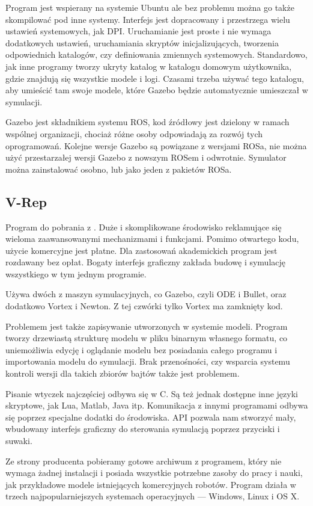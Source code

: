 	Program jest wspierany na systemie Ubuntu ale bez problemu można go także skompilować pod inne systemy.
	Interfejs jest dopracowany i przestrzega wielu ustawień systemowych, jak DPI.
	Uruchamianie jest proste i nie wymaga dodatkowych ustawień, uruchamiania skryptów inicjalizujących, tworzenia odpowiednich katalogów, czy definiowania zmiennych systemowych.
	Standardowo, jak inne programy tworzy ukryty katalog w katalogu domowym użytkownika, gdzie znajdują się wszystkie modele i logi.
	Czasami trzeba używać tego katalogu, aby umieścić tam swoje modele, które Gazebo będzie automatycznie umieszczał w symulacji.

	Gazebo jest składnikiem systemu ROS, kod źródłowy jest dzielony w ramach wspólnej organizacji, chociaż różne osoby odpowiadają za rozwój tych oprogramowań.
	Kolejne wersje Gazebo są powiązane z wersjami ROSa, nie można użyć przestarzałej wersji Gazebo z nowszym ROSem i odwrotnie.
	Symulator można zainstalować osobno, lub jako jeden z pakietów ROSa.

	\subsection{V-Rep}
	Program do pobrania z \cite{vrep_website}. Duże i skomplikowane środowisko reklamujące się wieloma zaawansowanymi mechanizmami i funkcjami.
	Pomimo otwartego kodu, użycie komercyjne jest płatne. Dla zastosowań akademickich program jest rozdawany bez opłat.
	Bogaty interfejs graficzny zakłada budowę i symulację wszystkiego w tym jednym programie.

	Używa dwóch z maszyn symulacyjnych, co Gazebo, czyli ODE i Bullet, oraz dodatkowo Vortex i Newton. Z tej czwórki tylko Vortex ma zamknięty kod.

	Problemem jest także zapisywanie utworzonych w systemie modeli.
	Program tworzy drzewiastą strukturę modelu w pliku binarnym własnego formatu, co uniemożliwia edycję i oglądanie modelu bez posiadania całego programu i importowania modelu do symulacji.
	Brak przenośności, czy wsparcia systemu kontroli wersji dla takich zbiorów bajtów także jest problemem.

	Pisanie wtyczek najczęściej odbywa się w C. Są też jednak dostępne inne języki skryptowe, jak Lua, Matlab, Java itp.
	Komunikacja z innymi programami odbywa się poprzez specjalne dodatki do środowiska.
	API pozwala nam stworzyć mały, wbudowany interfejs graficzny do sterowania symulacją poprzez przyciski i suwaki.

	Ze strony producenta pobieramy gotowe archiwum z programem, który nie wymaga żadnej instalacji i posiada wszystkie potrzebne zasoby do pracy i nauki, jak przykładowe modele istniejących komercyjnych robotów.
	Program działa w trzech najpopularniejszych systemach operacyjnych --- Windows, Linux i OS X.

